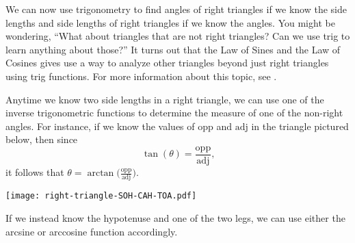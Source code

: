 \documentclass{ximera}
\begin{document}
We can now use trigonometry to find angles of right triangles if we know the side lengths and side lengths of right triangles if we know the angles.  You might be wondering, ``What about triangles that are not right triangles? Can we use trig to learn anything about those?''  It turns out that the Law of Sines and the Law of Cosines gives use a way to analyze other triangles beyond just right triangles using trig functions.  For more information about this topic, see .


\begin{summary}
Anytime we know two side lengths in a right triangle, we can use one of the inverse trigonometric functions to determine the measure of one of the non-right angles.  For instance, if we know the values of $\text{opp}$ and $\text{adj}$ in the triangle pictured below, then since%
\begin{equation*}
\tan(\theta) = \frac{\text{opp}}{\text{adj}}\text{,}
\end{equation*}
it follows that $\theta = \arctan\!\bigg(\frac{\text{opp}}{\text{adj}}\bigg)$.%
%
\begin{image}
\texttt{[image: right-triangle-SOH-CAH-TOA.pdf]}
\end{image}
%
\par
%
If we instead know the hypotenuse and one of the two legs, we can use either the arcsine or arccosine function accordingly.%
%

\end{summary}
\end{document}
